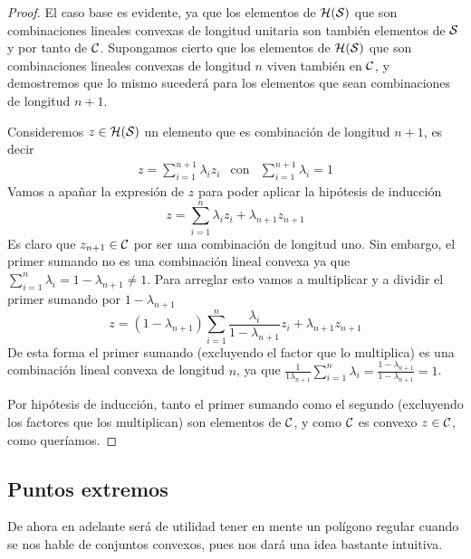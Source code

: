 \begin{proof}
	El caso base es evidente, ya que los elementos de $\mathcal{H}(\mathcal{S})$ que son combinaciones lineales convexas de longitud unitaria son también elementos de $\mathcal{S}$ y por tanto de $\mathcal{C}$. Supongamos cierto que los elementos de $\mathcal{H}(\mathcal{S})$ que son combinaciones lineales convexas de longitud $n$ viven también en $\mathcal{C}$, y demostremos que lo mismo sucederá para los elementos que sean combinaciones de longitud $n+1$.
	
	Consideremos $z\in\mathcal{H}(\mathcal{S})$ un elemento que es combinación de longitud $n+1$, es decir
	\begin{equation*}
	\begin{array}{ccc}
		z=\sum_{i=1}^{n+1}\lambda_iz_i & \text{con} & \sum_{i=1}^{n+1}\lambda_i=1
	\end{array}
	\end{equation*}
	Vamos a apañar la expresión de $z$ para poder aplicar la hipótesis de inducción
	\begin{equation*}
		z=\sum_{i=1}^{n}\lambda_iz_i + \lambda_{n+1}z_{n+1}
	\end{equation*}
	Es claro que $z_{n+1}\in\mathcal{C}$ por ser una combinación de longitud uno. Sin embargo, el primer sumando no es una combinación lineal convexa ya que $\sum_{i=1}^{n}\lambda_i=1-\lambda_{n+1}\not=1$. Para arreglar esto vamos a multiplicar y a  dividir el primer sumando por $1-\lambda_{n+1}$
	\begin{equation*}
		z=(1-\lambda_{n+1})\sum_{i=1}^{n}\frac{\lambda_i}{1-\lambda_{n+1}}z_i+\lambda_{n+1}z_{n+1}
	\end{equation*}
	De esta forma el primer sumando (excluyendo el factor que lo multiplica) es una combinación lineal convexa de longitud $n$, ya que $\frac{1}{1\lambda_{n+1}}\sum_{i=1}^{n}\lambda_i=\frac{1-\lambda_{n+1}}{1-\lambda_{n+1}}=1$.
	
	Por hipótesis de inducción, tanto el primer sumando como el segundo (excluyendo los factores que los multiplican) son elementos de $\mathcal{C}$, y como $\mathcal{C}$ es convexo $z\in\mathcal{C}$, como queríamos.
\end{proof}
\subsection{Puntos extremos}
De ahora en adelante será de utilidad tener en mente un polígono regular cuando se nos hable de conjuntos convexos, pues nos dará una idea bastante intuitiva.

